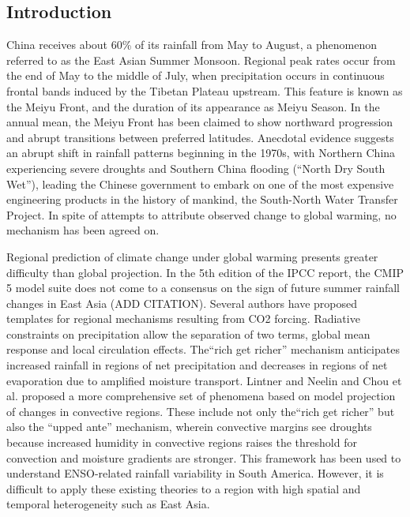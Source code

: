 \documentclass[draft,grl]{AGUTeX}
\begin{document}
\begin{article}

%

\section{Introduction}
China receives about 60\% of its rainfall from May to August, a phenomenon referred to as the East Asian Summer Monsoon. Regional peak rates occur from the end of May to the middle of July, when precipitation occurs in continuous frontal bands induced by the Tibetan Plateau upstream. This feature is known as the Meiyu Front, and the duration of its appearance as Meiyu Season. In the annual mean, the Meiyu Front has been claimed to show northward progression and abrupt transitions between preferred latitudes\citep{Ding2005}. Anecdotal evidence suggests an abrupt shift in rainfall patterns beginning in the 1970s, with Northern China experiencing severe droughts and Southern China flooding (``North Dry South Wet''), leading the Chinese government to embark on one of the most expensive engineering products in the history of mankind, the South-North Water Transfer Project. In spite of attempts to attribute observed change to global warming, no mechanism has been agreed on.

Regional prediction of climate change under global warming presents greater difficulty than global projection. In the 5th edition of the IPCC report, the CMIP 5 model suite does not come to a consensus on the sign of future summer rainfall changes in East Asia (ADD CITATION). Several authors have proposed templates for regional mechanisms resulting from CO2 forcing. Radiative constraints on precipitation allow the separation of two terms, global mean response and local circulation effects\citep{Muller2011}. The``rich get richer'' mechanism anticipates increased rainfall in regions of net precipitation and decreases in regions of net evaporation due to amplified moisture transport\citep{Held2006}. Lintner and Neelin\citet{Lintner2007} and Chou et al.\citet{Chou2009} proposed a more comprehensive set of phenomena based on model projection of changes in convective regions. These include not only the``rich get richer'' but also the ``upped ante'' mechanism, wherein convective margins see droughts because increased humidity in convective regions raises the threshold for convection and moisture gradients are stronger. This framework has been used to understand ENSO-related rainfall variability in South America. However, it is difficult to apply these existing theories to a region with high spatial and temporal heterogeneity such as East Asia.


\end{article}
\end{document}
